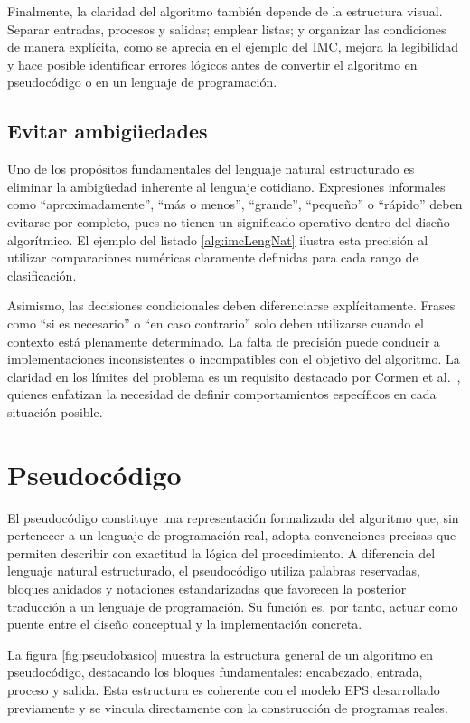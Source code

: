 \documentclass[12pt,twoside]{book}
\begin{document}
					Finalmente, la claridad del algoritmo también depende de la estructura visual. Separar entradas, procesos y salidas; emplear listas; y organizar las condiciones de manera explícita, como se aprecia en el ejemplo del IMC, mejora la legibilidad y hace posible identificar errores lógicos antes de convertir el algoritmo en pseudocódigo o en un lenguaje de programación.
					
				\subsection{Evitar ambigüedades}
					Uno de los propósitos fundamentales del lenguaje natural estructurado es eliminar la ambigüedad inherente al lenguaje cotidiano. Expresiones informales como “aproximadamente”, “más o menos”, “grande”, “pequeño” o “rápido” deben evitarse por completo, pues no tienen un significado operativo dentro del diseño algorítmico. El ejemplo del listado \ref{alg:imcLengNat} ilustra esta precisión al utilizar comparaciones numéricas claramente definidas para cada rango de clasificación.
					
					Asimismo, las decisiones condicionales deben diferenciarse explícitamente. Frases como “si es necesario” o “en caso contrario” solo deben utilizarse cuando el contexto está plenamente determinado. La falta de precisión puede conducir a implementaciones inconsistentes o incompatibles con el objetivo del algoritmo. La claridad en los límites del problema es un requisito destacado por Cormen et al.~\cite{Cormen2022Introduction}, quienes enfatizan la necesidad de definir comportamientos específicos en cada situación posible.
					
			\section{Pseudocódigo}
				\noindent
				El pseudocódigo constituye una representación formalizada del algoritmo que, sin pertenecer a un lenguaje de programación real, adopta convenciones precisas que permiten describir con exactitud la lógica del procedimiento. A diferencia del lenguaje natural estructurado, el pseudocódigo utiliza palabras reservadas, bloques anidados y notaciones estandarizadas que favorecen la posterior traducción a un lenguaje de programación. Su función es, por tanto, actuar como puente entre el diseño conceptual y la implementación concreta.
				
				La figura \ref{fig:pseudobasico} muestra la estructura general de un algoritmo en pseudocódigo, destacando los bloques fundamentales: encabezado, entrada, proceso y salida. Esta estructura es coherente con el modelo EPS desarrollado previamente y se vincula directamente con la construcción de programas reales.
				
\end{document}
